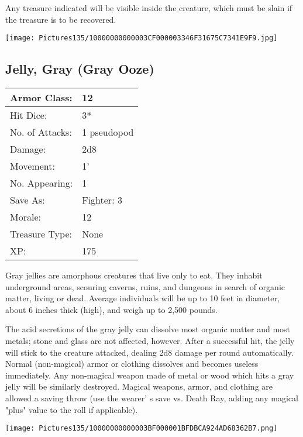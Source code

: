 \documentclass[a4paper,twoside,openany,10pt]{book}
\begin{document}
\begin{multicols}{2}
Any treasure indicated will be visible inside the creature, which must be slain if the treasure is to be recovered.

\begin{center} \texttt{[image: Pictures135/10000000000003CF000003346F31675C7341E9F9.jpg]} \end{center}


\subsection*{Jelly, Gray (Gray Ooze)}\label{jelly-gray-gray-ooze}

\begin{tabularx}{0.50\textwidth}{@{}lX@{}}
Armor Class: & 12 \\\hline
Hit Dice: & 3*  \\\hline
No. of Attacks: & 1 pseudopod \\\hline
Damage: & 2d8 \\\hline
Movement: & 1' \\\hline
No. Appearing: & 1 \\\hline
Save As: & Fighter: 3 \\\hline
Morale: & 12 \\\hline
Treasure Type: & None \\\hline
XP: & 175 \\\hline
\end{tabularx}\medskip

Gray jellies are amorphous creatures that live only to eat. They inhabit underground areas, scouring caverns, ruins, and dungeons in search of organic matter, living or dead. Average individuals will be up to 10 feet in diameter, about 6 inches thick (high), and weigh up to 2,500 pounds.

The acid secretions of the gray jelly can dissolve most organic matter and most metals; stone and glass are not affected, however. After a successful hit, the jelly will stick to the creature attacked, dealing 2d8 damage per round automatically. Normal (non-magical) armor or clothing dissolves and becomes useless immediately. Any non-magical weapon made of metal or wood which hits a gray jelly will be similarly destroyed. Magical weapons, armor, and clothing are allowed a saving throw (use the wearer' s save vs. Death Ray, adding any magical "plus" value to the roll if applicable).

\begin{center} \texttt{[image: Pictures135/10000000000003BF000001BFDBCA924AD68362B7.png]} \end{center}



\end{multicols}
\end{document}
